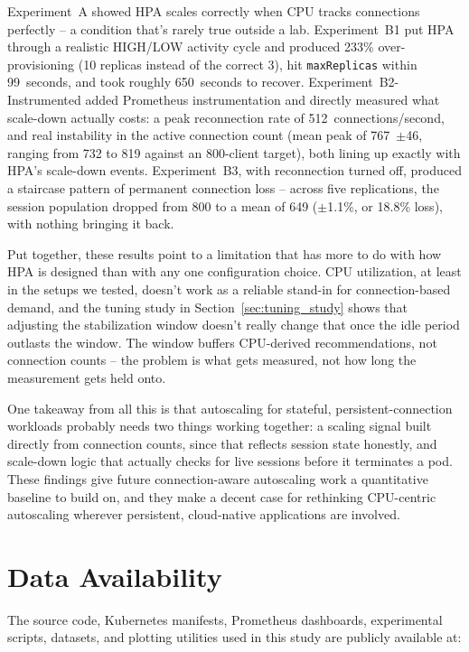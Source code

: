 \documentclass[twocolumn]{svjour3}
\begin{document}
Experiment~A showed HPA scales correctly when CPU tracks connections perfectly --
a condition that's rarely true outside a lab. Experiment~B1 put HPA through a
realistic HIGH/LOW activity cycle and produced 233\% over-provisioning (10 replicas
instead of the correct 3), hit \texttt{maxReplicas} within 99~seconds, and took
roughly 650~seconds to recover. Experiment~B2-Instrumented added Prometheus
instrumentation and directly measured what scale-down actually costs: a peak
reconnection rate of 512~connections/second, and real instability in the active
connection count (mean peak of 767~$\pm$46, ranging from 732 to 819 against an
800-client target), both lining up exactly with HPA's scale-down events.
Experiment~B3, with reconnection turned off, produced a staircase pattern of
permanent connection loss -- across five replications, the session population
dropped from 800 to a mean of 649 ($\pm$1.1\%, or 18.8\% loss), with nothing
bringing it back.

Put together, these results point to a limitation that has more to do with how HPA
is designed than with any one configuration choice. CPU utilization, at least in
the setups we tested, doesn't work as a reliable stand-in for connection-based
demand, and the tuning study in Section~\ref{sec:tuning_study} shows that adjusting
the stabilization window doesn't really change that once the idle period outlasts
the window. The window buffers CPU-derived recommendations, not connection counts
-- the problem is what gets measured, not how long the measurement gets held onto.

One takeaway from all this is that autoscaling for stateful, persistent-connection
workloads probably needs two things working together: a scaling signal built
directly from connection counts, since that reflects session state honestly, and
scale-down logic that actually checks for live sessions before it terminates a pod.
These findings give future connection-aware autoscaling work a quantitative
baseline to build on, and they make a decent case for rethinking CPU-centric
autoscaling wherever persistent, cloud-native applications are involved.



\section*{Data Availability}

The source code, Kubernetes manifests, Prometheus dashboards, experimental scripts,
datasets, and plotting utilities used in this study are publicly available at:
\end{document}
